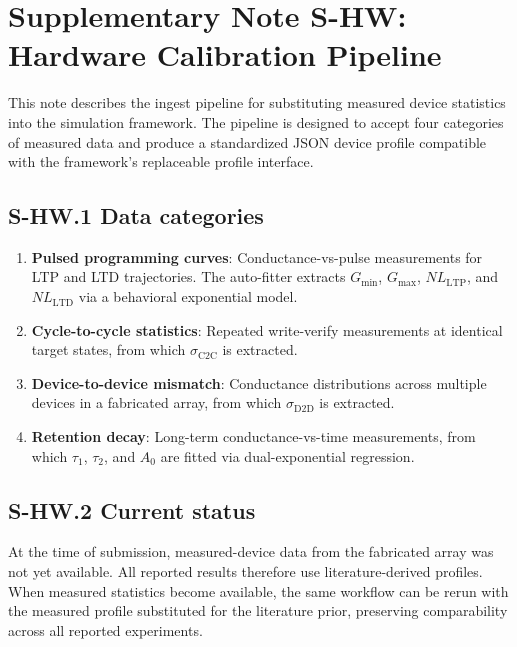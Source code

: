 
\section*{Supplementary Note S-HW: Hardware Calibration Pipeline}
\label{supp:hardware-calibration}

This note describes the ingest pipeline for substituting measured device statistics into the simulation framework. The pipeline is designed to accept four categories of measured data and produce a standardized JSON device profile compatible with the framework's replaceable profile interface.

\subsection*{S-HW.1 Data categories}

\begin{enumerate}[leftmargin=1.2em]
    \item \textbf{Pulsed programming curves}: Conductance-vs-pulse measurements for LTP and LTD trajectories. The auto-fitter extracts $G_{\min}$, $G_{\max}$, $NL_{\mathrm{LTP}}$, and $NL_{\mathrm{LTD}}$ via a behavioral exponential model.
    \item \textbf{Cycle-to-cycle statistics}: Repeated write-verify measurements at identical target states, from which $\sigma_{\mathrm{C2C}}$ is extracted.
    \item \textbf{Device-to-device mismatch}: Conductance distributions across multiple devices in a fabricated array, from which $\sigma_{\mathrm{D2D}}$ is extracted.
    \item \textbf{Retention decay}: Long-term conductance-vs-time measurements, from which $\tau_1$, $\tau_2$, and $A_0$ are fitted via dual-exponential regression.
\end{enumerate}

\subsection*{S-HW.2 Current status}

At the time of submission, measured-device data from the fabricated array was not yet available. All reported results therefore use literature-derived profiles. When measured statistics become available, the same workflow can be rerun with the measured profile substituted for the literature prior, preserving comparability across all reported experiments.
